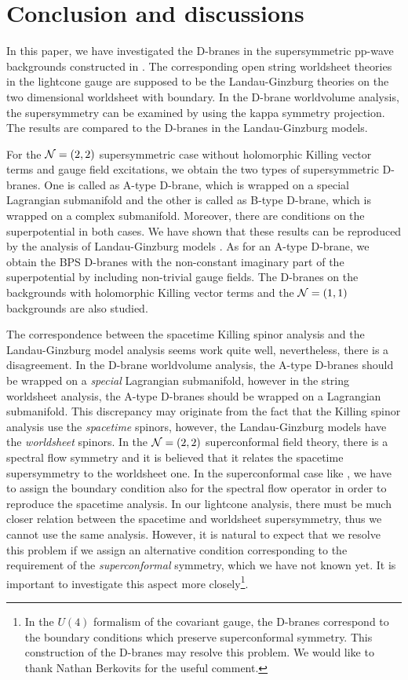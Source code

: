 \documentclass[a4paper,12pt]{article}
\numberwithin{equation}{section}
\begin{document}
\section{Conclusion and discussions}
\label{section-conclusion}

In this paper, we have investigated the D-branes in the supersymmetric
pp-wave backgrounds constructed in \cite{Maldacena:2002fy}.
The corresponding open string worldsheet theories in the
lightcone gauge are supposed to be the Landau-Ginzburg theories on the
two dimensional worldsheet with boundary. 
In the D-brane worldvolume analysis, the supersymmetry can be examined
by using the kappa symmetry projection.
The results are compared to the D-branes in the Landau-Ginzburg models.

For the ${\cal N}=(2,2)$ supersymmetric case without holomorphic Killing
vector terms and gauge field excitations, 
we obtain the two types of supersymmetric
D-branes. One is called as A-type D-brane, which is wrapped on a
special Lagrangian submanifold and the other is called as B-type
D-brane, which is wrapped on a complex submanifold.
Moreover, there are conditions on the superpotential in both cases.
We have shown that these results can be reproduced by
the analysis of Landau-Ginzburg models \cite{Hori:2000ck}.
As for an A-type D-brane, we obtain the BPS D-branes with the non-constant
imaginary part of the superpotential by including non-trivial gauge fields.
The D-branes on the backgrounds with holomorphic Killing vector terms
and the ${\cal N}=(1,1)$ backgrounds are also studied.

The correspondence between the spacetime Killing spinor
analysis and the Landau-Ginzburg model analysis seems work quite well,
nevertheless, there is a disagreement.
In the D-brane worldvolume analysis, the A-type D-branes should
be wrapped on a {\it special } Lagrangian submanifold, however in the
string worldsheet analysis, the A-type D-branes should be 
wrapped on a Lagrangian submanifold.
This discrepancy may originate from the fact that the Killing spinor
analysis use the {\it spacetime} spinors, however, the Landau-Ginzburg models
have the {\it worldsheet} spinors.
In the ${\cal N}=(2,2)$ superconformal field theory, there is a spectral flow
symmetry and it is believed that it relates 
the spacetime supersymmetry to the worldsheet one.
In the superconformal case like \cite{Ooguri:1996ck,Becker:1996ay},
we have to assign the boundary condition also for the spectral flow operator
in order to reproduce the spacetime analysis.
In our lightcone analysis, there must be much closer relation between
the spacetime and worldsheet supersymmetry, thus we cannot use the same
analysis.
However, it is natural to expect that we resolve this problem 
if we assign an alternative condition corresponding to
the requirement of the {\it superconformal} symmetry, which we have not
known yet.
It is important to investigate this aspect more closely\footnote{
In the $U(4)$ formalism \cite{Berkovits:2002vn} of the covariant
gauge, the D-branes correspond to the boundary conditions which preserve
superconformal symmetry. 
This construction of the D-branes may resolve this problem.
We would like to thank Nathan Berkovits for the useful comment.}.
\end{document}

